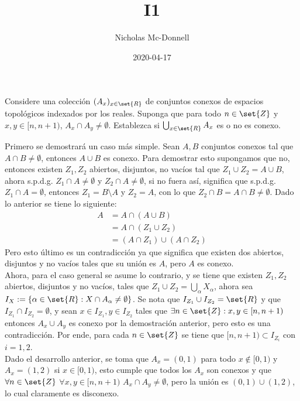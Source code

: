 \documentclass{homework}
\title{I1}
\date{2020-04-17}
\author{Nicholas Mc-Donnell}
\begin{document}
\maketitle
\newpage
{}

\begin{prob}
    Considere una colección \((A_x)_{x\in\set{R}}\) de conjuntos conexos de espacios topológicos indexados por los reales. Suponga que para todo \(n\in\set{Z}\) y \(x,y\in [n,n+1)\), \(A_x\cap A_y\neq\emptyset\). Establezca si \(\bigcup_{x\in\set{R}}A_x\) es o no es conexo.
\end{prob}

\begin{sol}
    Primero se demostrará un caso más simple. Sean \(A,B\) conjuntos conexos tal que \(A\cap B\neq\emptyset\), entonces \(A\cup B\) es conexo. Para demostrar esto supongamos que no, entonces existen \(Z_1,Z_2\) abiertos, disjuntos, no vacíos tal que \(Z_1\cup Z_2=A\cup B\), ahora s.p.d.g. \(Z_1\cap A\neq\emptyset\) y \(Z_2\cap A\neq\emptyset\), si no fuera así, significa que s.p.d.g. \(Z_1\cap A=\emptyset\), entonces \(Z_1=B\setminus A\) y \(Z_2=A\), con lo que \(Z_2\cap B=A\cap B\neq \emptyset\). Dado lo anterior se tiene lo siguiente:
    \begin{align*}
        A&=A\cap(A\cup B)\\
        &=A\cap(Z_1\cup Z_2)\\
        &=(A\cap Z_1)\cup(A\cap Z_2)
    \end{align*}
    Pero esto último es un contradicción ya que significa que existen dos abiertos, disjuntos y no vacíos tales que su unión es \(A\), pero \(A\) es conexo.\\
    Ahora, para el caso general se asume lo contrario, y se tiene que existen \(Z_1, Z_2\) abiertos, disjuntos y no vacíos, tales que \(Z_1\cup Z_2=\bigcup_\alpha X_\alpha\), ahora sea \(I_X:=\{\alpha\in\set{R}:X\cap A_\alpha \neq\emptyset\}\). Se nota que \(I_{Z_1}\cup I_{Z_2}=\set{R}\) y que \(I_{Z_1}\cap I_{Z_2}=\emptyset\), y sean \(x\in I_{Z_1},y\in I_{Z_2}\) tales que \(\exists n\in\set{Z}:x,y\in [n,n+1)\) entonces \(A_x\cup A_y\) es conexo por la demostración anterior, pero esto es una contradicción. Por ende, para cada \(n\in\set{Z}\) se tiene que \([n,n+1)\subset I_{Z_i}\) con \(i=1,2\).\\
    Dado el desarrollo anterior, se toma que \(A_x=(0,1)\) para todo \(x\notin [0,1)\) y \(A_x=(1,2)\) si \(x\in [0,1)\), esto cumple que todos los \(A_x\) son conexos y que \(\forall n\in\set{Z}\) \(\forall x,y\in[n,n+1)\) \(A_x\cap A_y\neq\emptyset\), pero la unión es \((0,1)\cup (1,2)\), lo cual claramente es disconexo.
\end{sol}
\end{document}
